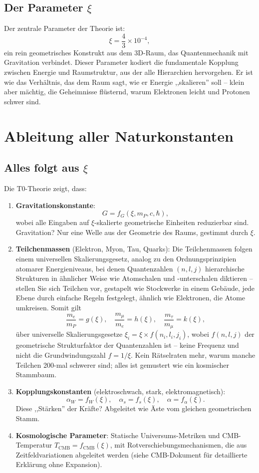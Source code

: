 	\subsection{Der Parameter $\xi$}
	Der zentrale Parameter der Theorie ist:
	\[
	\xi = \frac{4}{3} \times 10^{-4},
	\]
	ein rein geometrisches Konstrukt aus dem 3D-Raum, das Quantenmechanik mit Gravitation verbindet. Dieser Parameter kodiert die fundamentale Kopplung zwischen Energie und Raumstruktur, aus der alle Hierarchien hervorgehen. Er ist wie das Verhältnis, das dem Raum sagt, wie er Energie ,,skalieren'' soll – klein aber mächtig, die Geheimnisse flüsternd, warum Elektronen leicht und Protonen schwer sind.
	
	\section{Ableitung aller Naturkonstanten}
	
	\subsection{Alles folgt aus $\xi$}
	Die T0-Theorie zeigt, dass:
	
	\begin{enumerate}
		\item \textbf{Gravitationskonstante}:
		\[
		G = f_G(\xi, m_P, c, \hbar),
		\]
		wobei alle Eingaben auf $\xi$-skalierte geometrische Einheiten reduzierbar sind. Gravitation? Nur eine Welle aus der Geometrie des Raums, gestimmt durch $\xi$.
		
		\item \textbf{Teilchenmassen} (Elektron, Myon, Tau, Quarks):
		Die Teilchenmassen folgen einem universellen Skalierungsgesetz, analog zu den Ordnungsprinzipien atomarer Energieniveaus, bei denen Quantenzahlen $(n, l, j)$ hierarchische Strukturen in ähnlicher Weise wie Atomschalen und -unterschalen diktieren – stellen Sie sich Teilchen vor, gestapelt wie Stockwerke in einem Gebäude, jede Ebene durch einfache Regeln festgelegt, ähnlich wie Elektronen, die Atome umkreisen. Somit gilt
		\[
		\frac{m_e}{m_P} = g(\xi), \quad \frac{m_\mu}{m_e} = h(\xi), \quad \frac{m_\tau}{m_\mu} = k(\xi),
		\]
		über universelle Skalierungsgesetze $\xi_i = \xi \times f(n_i, l_i, j_i)$, wobei $f(n,l,j)$ der geometrische Strukturfaktor der Quantenzahlen ist -- keine Frequenz und nicht die Grundwindungszahl $f = 1/\xi$. Kein Rätselraten mehr, warum manche Teilchen 200-mal schwerer sind; alles ist gemustert wie ein kosmischer Stammbaum.
		
		\item \textbf{Kopplungskonstanten} (elektroschwach, stark, elektromagnetisch):
		\[
		\alpha_W = f_W(\xi), \quad \alpha_s = f_s(\xi), \quad \alpha = f_\alpha(\xi).
		\]
		Diese ,,Stärken'' der Kräfte? Abgeleitet wie Äste vom gleichen geometrischen Stamm.
		
		\item \textbf{Kosmologische Parameter}:
		Statische Universums-Metriken und CMB-Temperatur $T_{\text{CMB}} = f_{\text{CMB}}(\xi)$, mit Rotverschiebungsmechanismen, die aus Zeitfeldvariationen abgeleitet werden (siehe CMB-Dokument für detaillierte Erklärung ohne Expansion).
	\end{enumerate}

